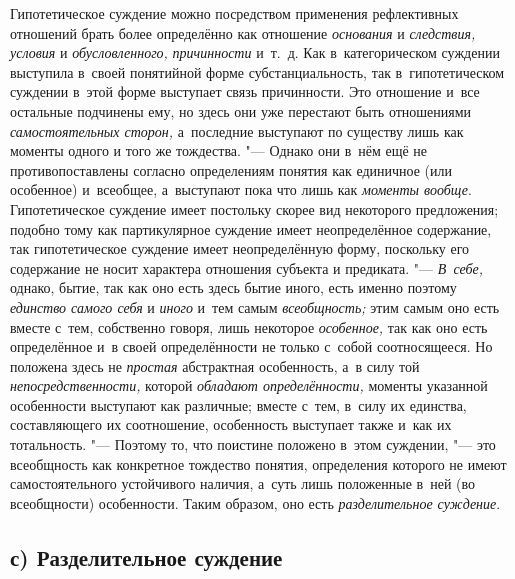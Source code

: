 Гипотетическое суждение можно посредством применения
рефлективных отношений брать более определённо как отношение
{\em основания} и {\em следствия, условия} и {\em обусловленного,}
{\em причинности} и~т.~д.
Как в~категорическом суждении выступила в~своей понятийной форме
субстанциальность, так в~гипотетическом суждении в~этой форме выступает
связь причинности. Это отношение и~все остальные подчинены ему, но здесь
они уже перестают быть отношениями
{\em самостоятельных сторон,}
а~последние выступают по существу лишь как моменты одного и
того же тождества. "--- Однако они в~нём ещё не
противопоставлены согласно определениям понятия как единичное (или
особенное) и~всеобщее, а~выступают пока что лишь как
{\em моменты вообще}.
Гипотетическое суждение имеет постольку скорее вид некоторого
предложения; подобно тому как партикулярное суждение имеет неопределённое
содержание, так гипотетическое суждение имеет неопределённую форму,
поскольку его содержание не носит характера отношения субъекта и
предиката. "--- {\em В~себе,}
однако, бытие, так как оно есть здесь бытие иного, есть
именно поэтому {\em единство самого
себя} и {\em иного}
и~тем самым
{\em всеобщность;} этим
самым оно есть вместе с~тем, собственно говоря, лишь некоторое
{\em особенное,} так как
оно есть определённое и~в своей определённости не только с~собой
соотносящееся. Но положена здесь не
{\em простая} абстрактная
особенность, а~в силу той
{\em непосредственности,}
которой {\em обладают
определённости,} моменты указанной особенности выступают как
различные; вместе с~тем, в~силу их единства, составляющего их соотношение,
особенность выступает также и~как их тотальность. "---
Поэтому то, что поистине положено в~этом суждении, "---
это всеобщность как конкретное тождество понятия,
определения которого не имеют самостоятельного устойчивого наличия, а~суть
лишь положенные в~ней (во всеобщности) особенности. Таким образом, оно есть
{\em разделительное суждение}.

\subsection[с) Разделительное суждение]{с) Разделительное суждение}

